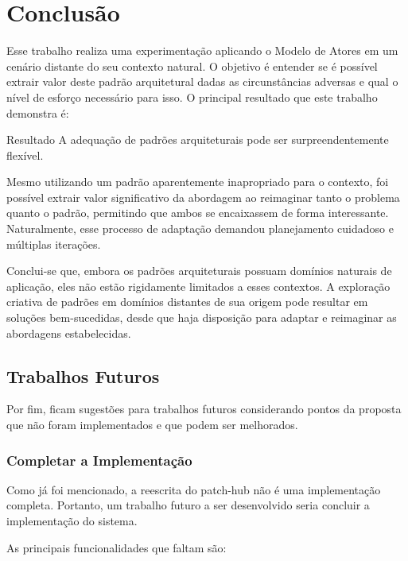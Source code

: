 \chapter{Conclusão}

Esse trabalho realiza uma experimentação aplicando o Modelo de Atores em um cenário distante do seu contexto natural. O objetivo é entender se é possível extrair valor deste padrão arquitetural dadas as circunstâncias adversas e qual o nível de esforço necessário para isso. O principal resultado que este trabalho demonstra é:

\begin{highlight-box}{Resultado}
    A adequação de padrões arquiteturais pode ser surpreendentemente flexível.
\end{highlight-box}

Mesmo utilizando um padrão aparentemente inapropriado para o contexto, foi possível extrair valor significativo da abordagem ao reimaginar tanto o problema quanto o padrão, permitindo que ambos se encaixassem de forma interessante. Naturalmente, esse processo de adaptação demandou planejamento cuidadoso e múltiplas iterações.

Conclui-se que, embora os padrões arquiteturais possuam domínios naturais de aplicação, eles não estão rigidamente limitados a esses contextos. A exploração criativa de padrões em domínios distantes de sua origem pode resultar em soluções bem-sucedidas, desde que haja disposição para adaptar e reimaginar as abordagens estabelecidas.

\section{Trabalhos Futuros}

Por fim, ficam sugestões para trabalhos futuros considerando pontos da proposta que não foram implementados e que podem ser melhorados.

\subsection{Completar a Implementação}

Como já foi mencionado, a reescrita do patch-hub não é uma implementação completa. Portanto, um trabalho futuro a ser desenvolvido seria concluir a implementação do sistema.

As principais funcionalidades que faltam são:

